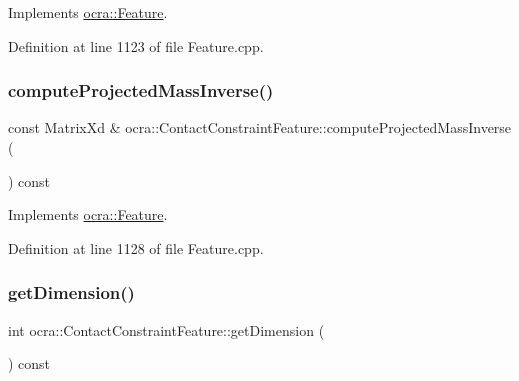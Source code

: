 Implements \hyperlink{classocra_1_1Feature_ac529096b3fe8eba1ab88a56d8b042d37}{ocra\+::\+Feature}.



Definition at line 1123 of file Feature.\+cpp.

\hypertarget{classocra_1_1ContactConstraintFeature_a78ba3452b7ad08dae7a266b0334aaa5d}{}\label{classocra_1_1ContactConstraintFeature_a78ba3452b7ad08dae7a266b0334aaa5d} 
\subsubsection{\texorpdfstring{compute\+Projected\+Mass\+Inverse()}{computeProjectedMassInverse()}\hspace{0.1cm}{\footnotesize\ttfamily [2/2]}}
{\footnotesize\ttfamily const Matrix\+Xd \& ocra\+::\+Contact\+Constraint\+Feature\+::compute\+Projected\+Mass\+Inverse (\begin{DoxyParamCaption}{ }\end{DoxyParamCaption}) const\hspace{0.3cm}{\ttfamily [virtual]}}



Implements \hyperlink{classocra_1_1Feature_ac27bcbdbb8541e3b4e2c77a6d6f2ffc0}{ocra\+::\+Feature}.



Definition at line 1128 of file Feature.\+cpp.

\hypertarget{classocra_1_1ContactConstraintFeature_ac498096b8df524b054f35b05d027f0f0}{}\label{classocra_1_1ContactConstraintFeature_ac498096b8df524b054f35b05d027f0f0} 
\subsubsection{\texorpdfstring{get\+Dimension()}{getDimension()}}
{\footnotesize\ttfamily int ocra\+::\+Contact\+Constraint\+Feature\+::get\+Dimension (\begin{DoxyParamCaption}{ }\end{DoxyParamCaption}) const\hspace{0.3cm}{\ttfamily [virtual]}}



